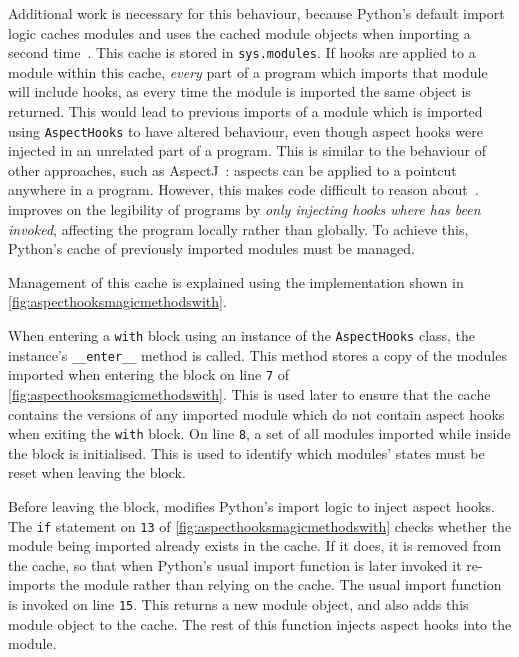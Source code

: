 Additional work is necessary for this behaviour, because Python's
default import logic caches modules and uses the cached module objects when
importing a second time~\cite{python_import_cache_definition}. This cache is
stored in \lstinline{sys.modules}. If hooks are applied to a module within this
cache, \emph{every} part of a program which imports that module will include
hooks, as every time the module is imported the same object is returned. This
would lead to previous imports of a module which is imported using
\lstinline{AspectHooks} to have altered behaviour, even though aspect hooks were
injected in an unrelated part of a program. This is similar to the behaviour of
other \aop{} approaches, such as AspectJ~\cite{AspectJLanguageAndTools}: aspects
can be applied to a pointcut anywhere in a program. However, this makes code
difficult to reason about~\cite{steimann06paradoxical,przybylek2010wrong}.
\pdsfthree{} improves on the legibility of \aspectoriented programs by
\emph{only injecting hooks where \pdsfthree{} has been invoked}, affecting the
program locally rather than globally. To achieve this, Python's cache of
previously imported modules must be managed.

Management of this cache is explained using the implementation shown in
\cref{fig:aspecthooksmagicmethodswith}.

When entering a \lstinline{with} block using an instance of the
\lstinline{AspectHooks} class, the instance's \lstinline{__enter__} method is
called. This method stores a copy of the modules imported when entering the
block on line \texttt{7} of \cref{fig:aspecthooksmagicmethodswith}. This is used
later to ensure that the cache contains the versions of any imported module
which do not contain aspect hooks when exiting the \lstinline{with} block. On
line \texttt{8}, a set of all modules imported while inside the block is
initialised. This is used to identify which modules' states must be reset when
leaving the block.

Before leaving the block, \pdsfthree{} modifies Python's import logic to inject
aspect hooks. The \lstinline{if} statement on \texttt{13} of
\cref{fig:aspecthooksmagicmethodswith} checks whether the module being imported
already exists in the cache. If it does, it is removed from the cache, so that
when Python's usual import function is later invoked it re-imports the module
rather than relying on the cache. The usual import function is invoked on line
\texttt{15}. This returns a new module object, and also adds this module object
to the cache. The rest of this function injects aspect hooks into the module.

